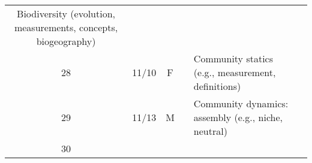 \documentclass[]{article}
\begin{document}
\begin{longtable}[]{@{}ccclll@{}}
\begin{minipage}[t]{0.12\columnwidth}
Biodiversity (evolution, measurements, concepts, biogeography)\strut
\end{minipage} & \begin{minipage}[t]{0.12\columnwidth}\raggedright\strut
\strut
\end{minipage}\tabularnewline
\begin{minipage}[t]{0.13\columnwidth}\centering\strut
28\strut
\end{minipage} & \begin{minipage}[t]{0.08\columnwidth}\centering\strut
11/10\strut
\end{minipage} & \begin{minipage}[t]{0.07\columnwidth}\centering\strut
F\strut
\end{minipage} & \begin{minipage}[t]{0.10\columnwidth}\raggedright\strut
\strut
\end{minipage} & \begin{minipage}[t]{0.12\columnwidth}\raggedright\strut
Community statics (e.g., measurement, definitions)\strut
\end{minipage} & \begin{minipage}[t]{0.12\columnwidth}\raggedright\strut
\strut
\end{minipage}\tabularnewline
\begin{minipage}[t]{0.13\columnwidth}\centering\strut
29\strut
\end{minipage} & \begin{minipage}[t]{0.08\columnwidth}\centering\strut
11/13\strut
\end{minipage} & \begin{minipage}[t]{0.07\columnwidth}\centering\strut
M\strut
\end{minipage} & \begin{minipage}[t]{0.10\columnwidth}\raggedright\strut
\strut
\end{minipage} & \begin{minipage}[t]{0.12\columnwidth}\raggedright\strut
Community dynamics: assembly (e.g., niche, neutral)\strut
\end{minipage} & \begin{minipage}[t]{0.12\columnwidth}\raggedright\strut
\strut
\end{minipage}\tabularnewline
\begin{minipage}[t]{0.13\columnwidth}\centering\strut
30\strut
\end{minipage} & \begin{minipage}[t]{0.08\columnwidth}\centering\strut

\end{minipage}
\end{longtable}
\end{document}
